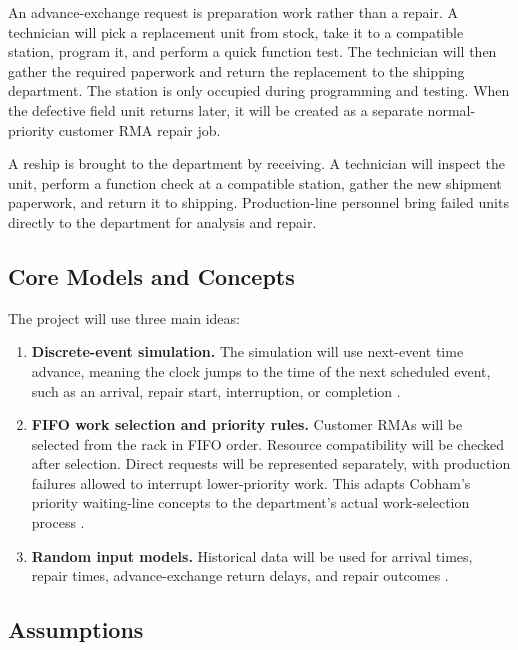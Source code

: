 \documentclass[12pt, letterpaper, twoside]{article}
\begin{document}
An advance-exchange request is preparation work rather than a repair. A technician will
pick a replacement unit from stock, take it to a compatible station, program it, and perform
a quick function test. The technician will then gather the required paperwork and return
the replacement to the shipping department. The station is only occupied during programming
and testing. When the defective field unit returns later, it will be created as a separate
normal-priority customer RMA repair job.

A reship is brought to the department by receiving. A technician will inspect the unit,
perform a function check at a compatible station, gather the new shipment paperwork,
and return it to shipping. Production-line personnel bring failed units directly to the
department for analysis and repair.

\subsection{Core Models and Concepts}

The project will use three main ideas:

\begin{enumerate}
    \item \textbf{Discrete-event simulation.} The simulation will use next-event time
    advance, meaning the clock jumps to the time of the next scheduled event, such as an
    arrival, repair start, interruption, or completion \cite{banks2005}.

    \item \textbf{FIFO work selection and priority rules.} Customer RMAs will be selected
    from the rack in FIFO order. Resource compatibility will be checked after selection.
    Direct requests will be represented separately, with production failures allowed to
    interrupt lower-priority work. This adapts Cobham's priority waiting-line concepts to
    the department's actual work-selection process \cite{cobham1954}.

    \item \textbf{Random input models.} Historical data will be used for arrival times,
    repair times, advance-exchange return delays, and repair outcomes \cite{law2015}.
\end{enumerate}

\subsection{Assumptions}
\end{document}
